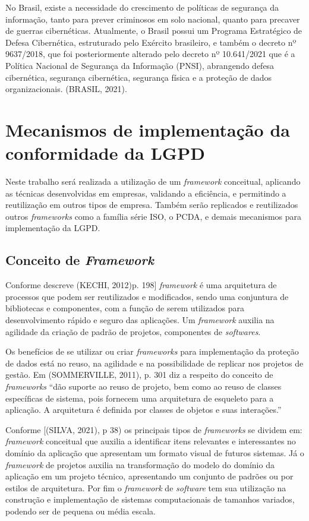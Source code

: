 \documentclass[
	12pt,				%
	openright,			%
	oneside,			%
	a4paper,			%
	english,			%
	french,				%
	spanish,			%
	brazil,				%
	]{abntex2}
\begin{document}
No Brasil, existe a necessidade do crescimento de políticas de segurança da informação, tanto para prever criminosos em solo nacional, quanto para precaver de guerras cibernéticas. Atualmente, o Brasil possui um Programa Estratégico de Defesa Cibernética, estruturado pelo Exército brasileiro, e também o decreto nº 9637/2018, que foi posteriormente alterado pelo decreto nº 10.641/2021 que é a Política Nacional de Segurança da Informação (PNSI), abrangendo defesa cibernética, segurança cibernética, segurança física e a proteção de dados organizacionais. (BRASIL, 2021).


\section{Mecanismos de implementação da conformidade da LGPD}

Neste trabalho será realizada a utilização de um \textit{framework} conceitual, aplicando as técnicas desenvolvidas em empresas, validando a eficiência, e permitindo a reutilização em outros tipos de empresa. Também serão replicados e reutilizados outros \textit{frameworks} como a família série ISO, o PCDA, e demais mecanismos para implementação da LGPD. 

\subsection{Conceito de \textit{Framework}}

Conforme descreve (KECHI, 2012)p. 198] \textit{framework} é uma arquitetura de processos que podem ser reutilizados e modificados, sendo uma conjuntura de bibliotecas e componentes, com a função de serem utilizados para desenvolvimento rápido e seguro das aplicações. Um \textit{framework} auxilia na agilidade da criação de padrão de projetos, componentes de \textit{softwares}.

Os benefícios de se utilizar ou criar \textit{frameworks} para implementação da proteção de dados está no reuso, na agilidade e na possibilidade de replicar nos projetos de gestão. Em (SOMMERVILLE, 2011), p. 301 diz a respeito do conceito de \textit{frameworks} “dão suporte ao reuso de projeto, bem como ao reuso de classes específicas de sistema, pois fornecem uma arquitetura de esqueleto para a aplicação. A arquitetura é definida por classes de objetos e suas interações.” 

Conforme [(SILVA, 2021), p 38) os principais tipos de \textit{frameworks} se dividem em: \textit{framework} conceitual que auxilia a identificar itens relevantes e interessantes no domínio da aplicação que apresentam um formato visual de futuros sistemas. Já o \textit{framework} de projetos auxilia na transformação do modelo do domínio da aplicação em um projeto técnico, apresentando um conjunto de padrões ou por estilos de arquitetura. Por fim o \textit{framework} de \textit{software} tem sua utilização na construção e implementação de sistemas computacionais de tamanhos variados, podendo ser de pequena ou média escala.
\end{document}
